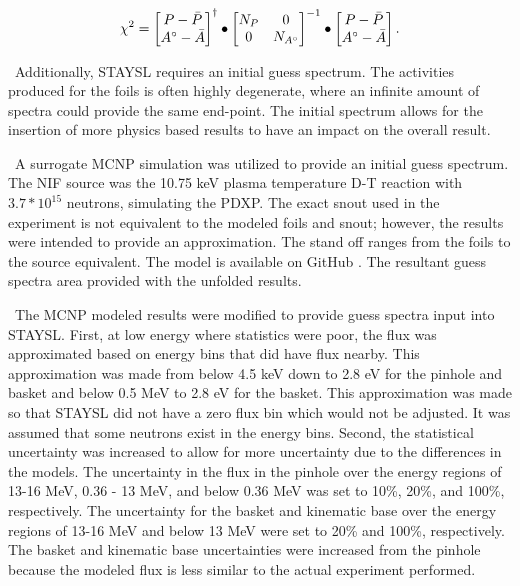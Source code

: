 \documentclass[journal]{IEEEtran}
\begin{document}
	\begin{equation} \label{eq:LeastSq}
	\chi^{2} = \begin{bmatrix}
	P-\bar{P} \\
	A^{\circ}-\bar{A}    
	\end{bmatrix}^{\dagger}
	\space 
	\bullet
	\space 
	\begin{bmatrix}
	N_{P}  &  0      \\
	0  &  N_{A^{\circ}}     
	\end{bmatrix}^{-1}
	\space
	\bullet
	\space
	\begin{bmatrix}
	P-\bar{P} \\
	A^{\circ}-\bar{A}    
	\end{bmatrix}.
	\end{equation} 
	
	\ Additionally, STAYSL requires an initial guess spectrum. The activities produced for the foils is often highly degenerate, where an infinite amount of spectra could provide the same end-point. The initial spectrum allows for the insertion of more physics based results to have an impact on the overall result. 
	
	\ A surrogate MCNP simulation was utilized to provide an initial guess spectrum. The NIF source was the 10.75 keV plasma temperature D-T reaction with $3.7*10^{15}$ neutrons, simulating the PDXP. The exact snout used in the experiment is not equivalent to the modeled foils and snout; however, the results were intended to provide an approximation. The stand off ranges from the foils to the source equivalent. The model is available on GitHub \cite{Me}. The resultant guess spectra area provided with the unfolded results. 
	
	\ The MCNP modeled results were modified to provide guess spectra input into STAYSL. First, at low energy where statistics were poor, the flux was approximated based on energy bins that did have flux nearby. This approximation was made from below 4.5 keV down to 2.8 eV for the pinhole and basket and below 0.5 MeV to 2.8 eV for the basket.  This approximation was made so that STAYSL did not have a zero flux bin which would not be adjusted. It was assumed that some neutrons exist in the energy bins. 
Second, the statistical uncertainty was increased to allow for more uncertainty due to the differences in the models. The uncertainty in the flux in the pinhole over the energy regions of 13-16 MeV, 0.36 - 13 MeV, and below 0.36 MeV was set to 10\%, 20\%, and 100\%, respectively. The uncertainty for the basket and kinematic base over the energy regions of 13-16 MeV and below 13 MeV were set to 20\% and 100\%, respectively. The basket and kinematic base uncertainties were increased from the pinhole because the modeled flux is less similar to the actual experiment performed. 
	
\end{document}
